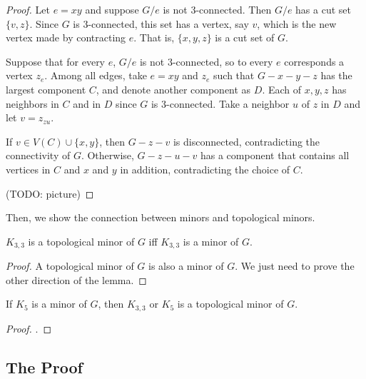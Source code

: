         \begin{proof}
            Let $e=xy$ and suppose $G/e$ is not 3-connected. Then $G/e$ has a cut set $\{v, z\}$. Since $G$ is 3-connected, this set has a vertex, say $v$, which is the new vertex made by contracting $e$. That is, $\{x, y, z\}$ is a cut set of $G$.
            
            Suppose that for every $e$, $G/e$ is not 3-connected, so to every $e$ corresponds a vertex $z_e$. Among all edges, take $e=xy$ and $z_e$ such that $G-x-y-z$ has the largest component $C$, and denote another component as $D$. Each of $x,y,z$ has neighbors in $C$ and in $D$ since $G$ is 3-connected. Take a neighbor $u$ of $z$ in $D$ and let $v=z_{zu}$.
            
            If $v \in V(C) \cup \{x,y\}$, then $G-z-v$ is disconnected, contradicting the connectivity of $G$. Otherwise, $G-z-u-v$ has a component that contains all vertices in $C$ and $x$ and $y$ in addition, contradicting the choice of $C$.
            
            (TODO: picture)
        \end{proof}
        
        Then, we show the connection between minors and topological minors.
        
        \begin{lemma} \label{lem_minor_K33}
            $K_{3,3}$ is a topological minor of $G$ iff $K_{3,3}$ is a minor of $G$.
        \end{lemma}
        
        \begin{proof}
            A topological minor of $G$ is also a minor of $G$. We just need to prove the other direction of the lemma.
            
            
        \end{proof}
        
        \begin{lemma} \label{lem_minor_K5}
            If $K_5$ is a minor of $G$, then $K_{3,3}$ or $K_5$ is a topological minor of $G$.
        \end{lemma}
        
        \begin{proof}
            .
        \end{proof}
    
    \subsection{The Proof}
    
